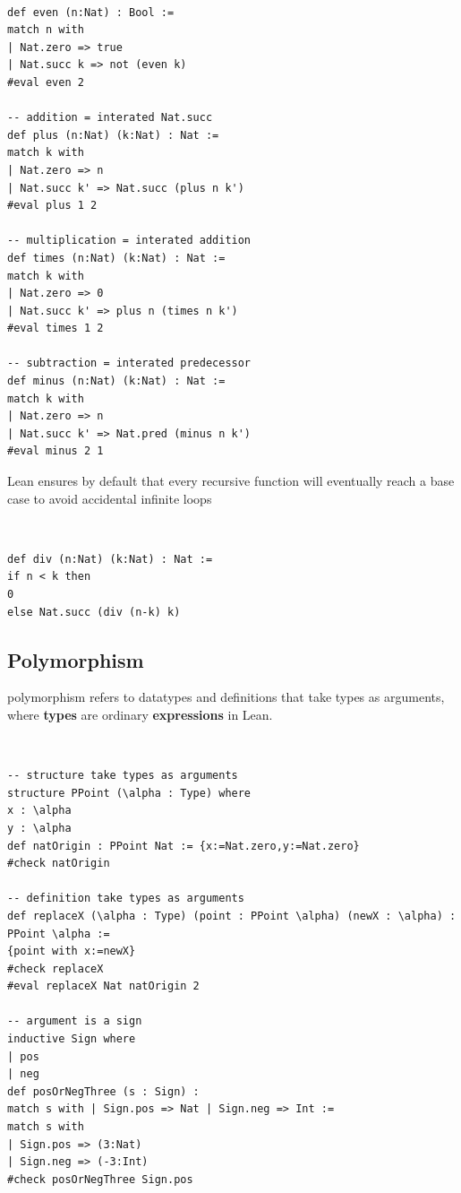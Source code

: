 \documentclass{article}
\begin{document}
\begin{definition}~
    \begin{verbatim}
def even (n:Nat) : Bool :=
match n with
| Nat.zero => true
| Nat.succ k => not (even k)
#eval even 2

-- addition = interated Nat.succ
def plus (n:Nat) (k:Nat) : Nat :=
match k with
| Nat.zero => n
| Nat.succ k' => Nat.succ (plus n k')
#eval plus 1 2

-- multiplication = interated addition
def times (n:Nat) (k:Nat) : Nat :=
match k with
| Nat.zero => 0
| Nat.succ k' => plus n (times n k')
#eval times 1 2

-- subtraction = interated predecessor
def minus (n:Nat) (k:Nat) : Nat :=
match k with
| Nat.zero => n
| Nat.succ k' => Nat.pred (minus n k')
#eval minus 2 1
\end{verbatim}
\end{definition}

\begin{remark}
    Lean ensures by default that every recursive function will eventually reach a base case to avoid accidental infinite loops
\end{remark}

\begin{example}~
    \begin{verbatim}
def div (n:Nat) (k:Nat) : Nat :=
if n < k then
0
else Nat.succ (div (n-k) k)
\end{verbatim}
\end{example}

\subsection{Polymorphism}
\begin{definition}[polymorphism]
    polymorphism refers to datatypes and definitions that take types as arguments, where \textbf{types} are ordinary \textbf{expressions} in Lean.
\end{definition}

\begin{example}~
    \begin{verbatim}
-- structure take types as arguments
structure PPoint (\alpha : Type) where
x : \alpha
y : \alpha
def natOrigin : PPoint Nat := {x:=Nat.zero,y:=Nat.zero}
#check natOrigin

-- definition take types as arguments
def replaceX (\alpha : Type) (point : PPoint \alpha) (newX : \alpha) : PPoint \alpha :=
{point with x:=newX}
#check replaceX
#eval replaceX Nat natOrigin 2

-- argument is a sign
inductive Sign where
| pos
| neg
def posOrNegThree (s : Sign) :
match s with | Sign.pos => Nat | Sign.neg => Int :=
match s with
| Sign.pos => (3:Nat)
| Sign.neg => (-3:Int)
#check posOrNegThree Sign.pos
\end{verbatim}
\end{example}
\end{document}
